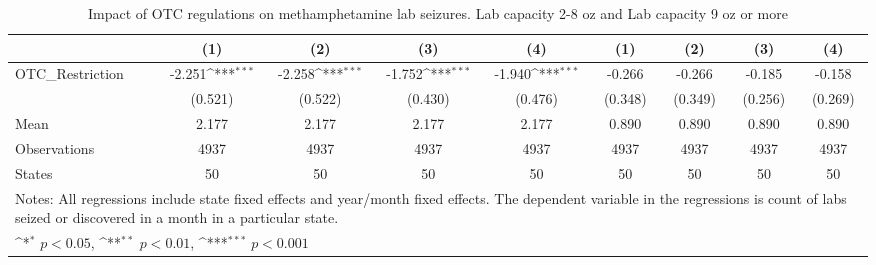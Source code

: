 \begin{table}[htbp]\centering
\def\sym#1{\ifmmode^{#1}\else\(^{#1}\)\fi}
\caption{Impact of OTC regulations on methamphetamine lab seizures. Lab capacity 2-8 oz and Lab capacity 9 oz or more }
\begin{tabular}{l*{8}{c}}
\hline\hline
          &\multicolumn{1}{c}{(1)}&\multicolumn{1}{c}{(2)}&\multicolumn{1}{c}{(3)}&\multicolumn{1}{c}{(4)}&\multicolumn{1}{c}{(1)}&\multicolumn{1}{c}{(2)}&\multicolumn{1}{c}{(3)}&\multicolumn{1}{c}{(4)}\\
\hline
OTC\_Restriction&   -2.251\sym{***}&   -2.258\sym{***}&   -1.752\sym{***}&   -1.940\sym{***}&   -0.266         &   -0.266         &   -0.185         &   -0.158         \\
          &  (0.521)         &  (0.522)         &  (0.430)         &  (0.476)         &  (0.348)         &  (0.349)         &  (0.256)         &  (0.269)         \\
\hline
Mean      &    2.177         &    2.177         &    2.177         &    2.177         &    0.890         &    0.890         &    0.890         &    0.890         \\
Observations&     4937         &     4937         &     4937         &     4937         &     4937         &     4937         &     4937         &     4937         \\
States    &       50         &       50         &       50         &       50         &       50         &       50         &       50         &       50         \\
\hline\hline
\multicolumn{9}{l}{\footnotesize Notes: All regressions include state fixed effects and year/month fixed effects. The dependent variable in the regressions is count of labs seized or discovered in a month in a particular state.}\\
\multicolumn{9}{l}{\footnotesize \sym{*} \(p<0.05\), \sym{**} \(p<0.01\), \sym{***} \(p<0.001\)}\\
\end{tabular}
\end{table}
